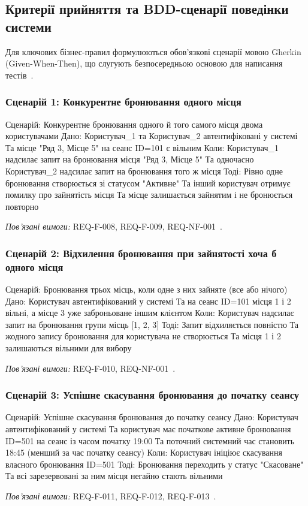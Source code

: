 \subsection{Критерії прийняття та BDD-сценарії поведінки системи}\label{sec:tdd-bdd}
Для ключових бізнес-правил формулюються обов'язкові сценарії мовою Gherkin (Given-When-Then), що слугують безпосередньою основою для написання тестів~.

\subsubsection{Сценарій 1: Конкурентне бронювання одного місця}\label{sec:bdd-sc1}
\begin{skedcode}
Сценарій: Конкурентне бронювання одного й того самого місця двома користувачами
  Дано: Користувач_1 та Користувач_2 автентифіковані у системі
    Та місце "Ряд 3, Місце 5" на сеанс ID=101 є вільним
  Коли: Користувач_1 надсилає запит на бронювання місця "Ряд 3, Місце 5"
    Та одночасно Користувач_2 надсилає запит на бронювання того ж місця
  Тоді: Рівно одне бронювання створюється зі статусом "Активне"
    Та інший користувач отримує помилку про зайнятість місця
    Та місце залишається зайнятим і не бронюється повторно
\end{skedcode}
\noindent\textit{Пов'язані вимоги:} REQ-F-008, REQ-F-009, REQ-NF-001~.

\subsubsection{Сценарій 2: Відхилення бронювання при зайнятості хоча б одного місця}\label{sec:bdd-sc2}
\begin{skedcode}
Сценарій: Бронювання трьох місць, коли одне з них зайняте (все або нічого)
  Дано: Користувач автентифікований у системі
    Та на сеанс ID=101 місця 1 і 2 вільні, а місце 3 уже заброньоване іншим клієнтом
  Коли: Користувач надсилає запит на бронювання групи місць [1, 2, 3]
  Тоді: Запит відхиляється повністю
    Та жодного запису бронювання для користувача не створюється
    Та місця 1 і 2 залишаються вільними для вибору
\end{skedcode}
\noindent\textit{Пов'язані вимоги:} REQ-F-010, REQ-NF-001~.

\subsubsection{Сценарій 3: Успішне скасування бронювання до початку сеансу}\label{sec:bdd-sc3}
\begin{skedcode}
Сценарій: Успішне скасування бронювання до початку сеансу
  Дано: Користувач автентифікований у системі
    Та користувач має початкове активне бронювання ID=501 на сеанс із часом початку 19:00
    Та поточний системний час становить 18:45 (менший за час початку сеансу)
  Коли: Користувач ініціює скасування власного бронювання ID=501
  Тоді: Бронювання переходить у статус "Скасоване"
    Та всі зарезервовані за ним місця негайно стають вільними
\end{skedcode}
\noindent\textit{Пов'язані вимоги:} REQ-F-011, REQ-F-012, REQ-F-013~.

